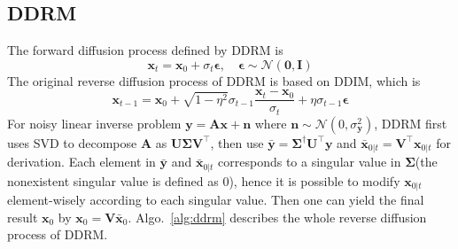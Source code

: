 \documentclass{article} \usepackage{iclr2023_conference,times}
\begin{document}
\subsection{DDRM} The forward diffusion process defined by DDRM is
\begin{equation}
    \mathbf{x}_{t} = \mathbf{x}_{0} + \sigma_{t}\boldsymbol{\epsilon},\quad \boldsymbol{\epsilon}\sim\mathcal{N}(\mathbf{0},\mathbf{I})
    \label{eq:ddrm1}
\end{equation}
The original reverse diffusion process of DDRM is based on DDIM, which is
\begin{equation}
    \mathbf{x}_{t-1} = \mathbf{x}_{0} + \sqrt{1-\eta^{2}}\sigma_{t-1}\frac{\mathbf{x}_{t}-\mathbf{x}_{0}}{\sigma_{t}} + \eta\sigma_{t-1}\boldsymbol{\epsilon}
    \label{eq:ddrm2}
\end{equation}
For noisy linear inverse problem $\mathbf{y}=\mathbf{A}\mathbf{x}+\mathbf{n}$ where $\mathbf{n}\sim\mathcal{N}(0,\sigma_{\mathbf{y} }^{2})$, DDRM first uses SVD to decompose $\mathbf{A}$ as $\mathbf{U}\mathbf{\Sigma}\mathbf{V}^\top$, then use $\bar{\mathbf{y}}=\mathbf{\Sigma}^{\dagger}\mathbf{U}^\top\mathbf{y}$ and $\bar{\mathbf{x}}_{0|t}=\mathbf{V}^\top\mathbf{x}_{0|t}$ for derivation. Each element in $\bar{\mathbf{y}}$ and $\bar{\mathbf{x}}_{0|t}$ corresponds to a singular value in $\mathbf{\Sigma}$(the nonexistent singular value is defined as 0), hence it is possible to modify $\mathbf{x}_{0|t}$ element-wisely according to each singular value. Then one can yield the final result $\mathbf{x}_{0}$ by $\mathbf{x}_{0}= \mathbf{V}\bar{\mathbf{x}}_{0}$. Algo.~\ref{alg:ddrm} describes the whole reverse diffusion process of DDRM. 
\end{document}
